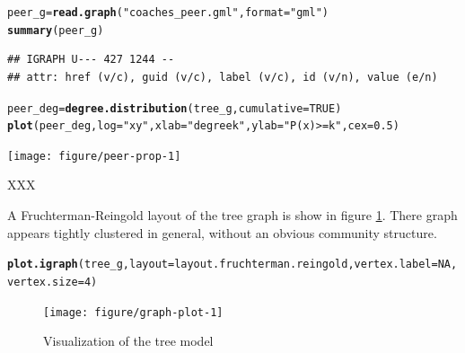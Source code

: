 \documentclass[11pt]{article}\usepackage[]{graphicx}\usepackage[]{color}
\makeatletter
\newcommand{\hlnum}[1]{\textcolor[rgb]{0.686,0.059,0.569}{#1}}%
\newcommand{\hlstr}[1]{\textcolor[rgb]{0.192,0.494,0.8}{#1}}%
\newcommand{\hlstd}[1]{\textcolor[rgb]{0.345,0.345,0.345}{#1}}%
\newcommand{\hlkwb}[1]{\textcolor[rgb]{0.69,0.353,0.396}{#1}}%
\newcommand{\hlkwc}[1]{\textcolor[rgb]{0.333,0.667,0.333}{#1}}%
\newcommand{\hlkwd}[1]{\textcolor[rgb]{0.737,0.353,0.396}{\textbf{#1}}}%
\newenvironment{kframe}{%
 \def\at@end@of@kframe{}%
 \ifinner\ifhmode%
  \def\at@end@of@kframe{\end{minipage}}%
  \begin{minipage}{\columnwidth}%
 \fi\fi%
 \def\FrameCommand##1{\hskip\@totalleftmargin \hskip-\fboxsep
 \colorbox{shadecolor}{##1}\hskip-\fboxsep
     \hskip-\linewidth \hskip-\@totalleftmargin \hskip\columnwidth}%
 \MakeFramed {\advance\hsize-\width
   \@totalleftmargin\z@ \linewidth\hsize
   \@setminipage}}%
 {\par\unskip\endMakeFramed%
 \at@end@of@kframe}
\newenvironment{knitrout}{}{} %
\makeatother
\begin{document}
\begin{knitrout}
\color{fgcolor}\begin{kframe}
\begin{alltt}
\hlstd{peer_g} \hlkwb{=} \hlkwd{read.graph}\hlstd{(}\hlstr{"coaches_peer.gml"}\hlstd{,}\hlkwc{format}\hlstd{=}\hlstr{"gml"}\hlstd{)}
\hlkwd{summary}\hlstd{(peer_g)}
\end{alltt}
\begin{verbatim}
## IGRAPH U--- 427 1244 -- 
## attr: href (v/c), guid (v/c), label (v/c), id (v/n), value (e/n)
\end{verbatim}
\begin{alltt}
\hlstd{peer_deg} \hlkwb{=} \hlkwd{degree.distribution}\hlstd{(tree_g,} \hlkwc{cumulative} \hlstd{=} \hlnum{TRUE}\hlstd{)}
\hlkwd{plot}\hlstd{(peer_deg,}\hlkwc{log}\hlstd{=}\hlstr{"xy"}\hlstd{,}\hlkwc{xlab}\hlstd{=}\hlstr{"degree k"}\hlstd{,}\hlkwc{ylab}\hlstd{=}\hlstr{"P(x) >= k"}\hlstd{,}\hlkwc{cex}\hlstd{=}\hlnum{0.5}\hlstd{)}
\end{alltt}
\end{kframe}

{\centering \texttt{[image: figure/peer-prop-1]} 

}



\end{knitrout}

XXX

A Fruchterman-Reingold layout of the tree graph is show in figure
\ref{fig:graph-plot}.  There graph appears tightly clustered in general, without
an obvious community structure.

\begin{knitrout}
\color{fgcolor}\begin{kframe}
\begin{alltt}
\hlkwd{plot.igraph}\hlstd{(tree_g,} \hlkwc{layout}\hlstd{=layout.fruchterman.reingold,} \hlkwc{vertex.label}\hlstd{=}\hlnum{NA}\hlstd{,} \hlkwc{vertex.size}\hlstd{=}\hlnum{4}\hlstd{)}
\end{alltt}
\end{kframe}\begin{figure}

{\centering \texttt{[image: figure/graph-plot-1]} 

}

\caption[Visualization of the tree model]{Visualization of the tree model\label{fig:graph-plot}}
\end{figure}


\end{knitrout}
\end{document}
